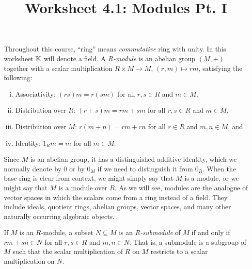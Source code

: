 \documentclass[12pt,reqno]{amsart}
\title{Worksheet 4.1: Modules Pt. I}
\begin{document}

\maketitle
\thispagestyle{firstpageIP}

Throughout this course, ``ring'' means \textit{commutative} ring with unity. In this worksheet $\mathbb{K}$ will denote a field. A \emph{$R$-module} is an abelian group $(M, +)$ together with a scalar multiplication $R\times M \to M$, $(r,m) \mapsto rm$, satisfying the following:
\begin{enumerate}[(i)]
	\item Associativity: $(rs)m = r(sm)$ for all $r,s \in R$ and $m \in M$,
	\item Distribution over $R$: $(r+s)m = rm + sm$ for all $r,s\in R$ and $m\in M$, 
	\item Distribution over $M$: $r(m+n) = rm+rn$ for all $r\in R$ and $m,n\in M$, and
	\item Identity: $1_{R}m = m$ for all $m\in M$. 
\end{enumerate}
Since $M$ is an abelian group, it has a distinguished additive identity, which we normally denote by $0$ or by $0_{M}$ if we need to distinguish it from $0_{R}$. When the base ring is clear from context, we might simply say that $M$ is a module, or we might say that $M$ is a module over $R$. As we will see, modules are the analogue of vector spaces in which the scalars come from a ring instead of a field. They include ideals, quotient rings, abelian groups, vector spaces, and many other naturally occurring algebraic objects.  

If $M$ is an $R$-module, a subset $N \subseteq M$ is an \emph{$R$-submodule} of $M$ if and only if $rm+sn \in N$ for all $r,s\in R$ and $m,n\in N$. That is, a submodule is a subgroup of $M$ such that the scalar multiplication of $R$ on $M$ restricts to a scalar multiplication on $N$. 

\hrulefill
\end{document}

